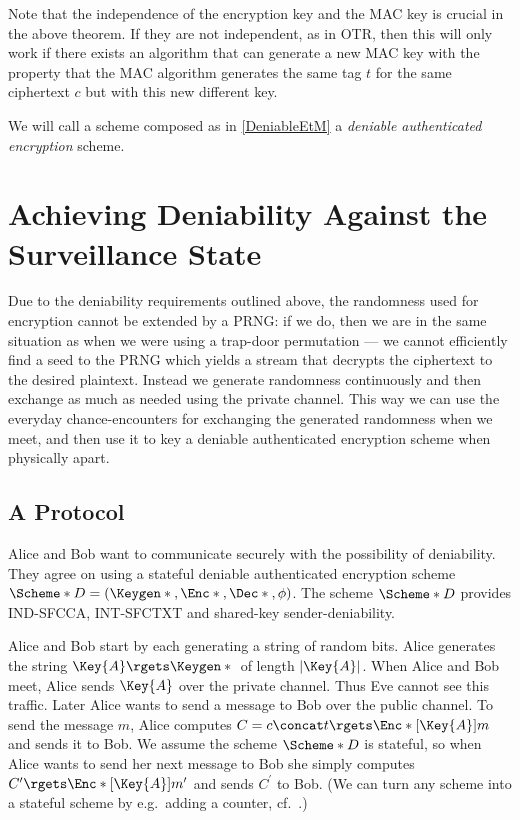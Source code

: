 Note that the independence of the encryption key and the \ac{MAC} key is 
crucial in the above theorem.
If they are not independent, as in \ac{OTR}, then this will only work if there 
exists an algorithm that can generate a new \ac{MAC} key with the property that 
the \ac{MAC} algorithm generates the same tag \(t\) for the same ciphertext 
\(c\) but with this new different key.

We will call a scheme composed as in \cref{DeniableEtM} a \emph{deniable 
  authenticated encryption} scheme.


\section{Achieving Deniability Against the Surveillance State}
\label{AchievingDeniability}

Due to the deniability requirements outlined above, the randomness used for 
encryption cannot be extended by a \ac{PRNG}: if we do, then we are in the same 
situation as when we were using a trap-door permutation --- we cannot 
efficiently find a seed to the \ac{PRNG} which yields a stream that decrypts 
the ciphertext to the desired plaintext.
Instead we generate randomness continuously and then exchange as much as needed 
using the private channel.
This way we can use the everyday chance-encounters for exchanging the generated 
randomness when we meet, and then use it to key a deniable authenticated 
encryption scheme when physically apart.

\subsection{A Protocol}
\label{TheProtocol}

Alice and Bob want to communicate securely with the possibility of deniability.
They agree on using a stateful deniable authenticated encryption scheme 
\(\Scheme*{D} = (\Keygen*{}, \Enc*{}, \Dec*{}, \phi)\).
The scheme \(\Scheme*{D}\) provides \ac{IND-SFCCA}, \ac{INT-SFCTXT} and 
shared-key sender-deniability.

Alice and Bob start by each generating a string of random bits.
Alice generates the string \(\Key{A}\rgets \Keygen*{}\) of length 
\(|\Key{A}|\).
When Alice and Bob meet, Alice sends \(\Key{A}\) over the private channel.
Thus Eve cannot see this traffic.
Later Alice wants to send a message to Bob over the public channel.
To send the message \(m\), Alice computes \(C = c\concat t\rgets 
  \Enc*[\Key{A}]{m}\) and sends it to Bob.
We assume the scheme \(\Scheme*{D}\) is stateful, so when Alice wants to send 
her next message to Bob she simply computes \(C^\prime\rgets \Enc*[\Key{A}]{ 
    m^\prime }\) and sends \(C^\prime\) to Bob.
(We can turn any scheme into a stateful scheme by e.g.\ adding a counter, 
cf.~\cite{StatefulDecryption}.)

